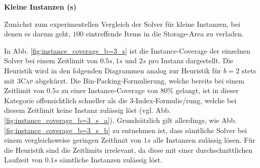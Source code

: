 \vfill
\pagebreak

\textbf{Kleine Instanzen (s)}

Zunächst zum experimentellen Vergleich der Solver für kleine Instanzen, bei denen es darum geht,
$100$ eintreffende Items in die Storage-Area zu verladen.

In Abb. \ref{fig:instance_coverage_b=3_s} ist die Instance-Coverage der einzelnen Solver bei einem Zeitlimit von $0.5s, 1s$ und $2s$ pro Instanz dargestellt. Die Heuristik wird in den folgenden Diagrammen analog zur Heuristik für $b = 2$ stets mit \textsc{3Cap} abgekürzt. Die Bin-Packing-Formulierung, welche bereits bei einem Zeitlimit von $0.5s$ zu einer Instance-Coverage von $80 \%$ gelangt, ist in dieser Kategorie offensichtlich schneller als die 3-Index-Formulie\-/rung, welche bei diesem Zeitlimit keine Instanz zulässig löst (vgl. Abb. \ref{fig:instance_coverage_b=3_s_a}).
Grundsätzlich gilt allerdings, wie Abb. \ref{fig:instance_coverage_b=3_s_b} zu entnehmen ist, dass sämtliche Solver
bei einem vergleichsweise geringen Zeitlimit von $1s$ alle Instanzen zulässig lösen.
Für die Heuristik sind die Zeitlimits irrelevant, da diese mit einer durchschnittlichen Laufzeit
von $0.1s$ sämtliche Instanzen zulässig löst.

